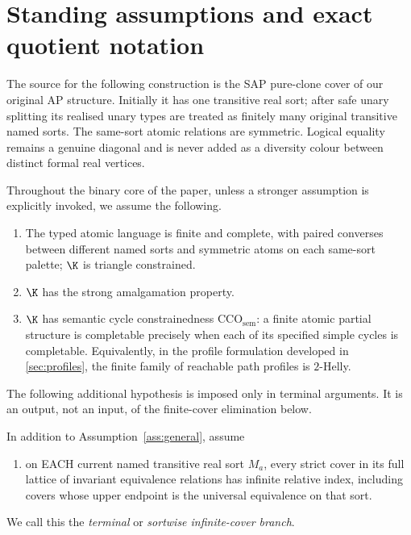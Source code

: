 \section{Standing assumptions and exact quotient notation}
\label{sec:internal-v27-premises}

The source for the following construction is the SAP pure-clone cover of
our original AP structure. Initially it has one transitive real sort;
after safe unary splitting its realised unary types are treated as finitely
many original transitive named sorts. The same-sort atomic relations are
symmetric. Logical equality remains a genuine diagonal and is never added
as a diversity colour between distinct formal real vertices.

\begin{assumption}\label{ass:general}
Throughout the binary core of the paper, unless a stronger assumption is
explicitly invoked, we assume the following.
\begin{enumerate}[label=(A\arabic*)]
\item \label{A:finite} The typed atomic language is finite and complete, with paired converses
      between different named sorts and symmetric atoms on each same-sort
      palette; $\K$ is triangle constrained.
\item \label{A:sap} $\K$ has the strong amalgamation property.
\item \label{A:cco} $\K$ has semantic cycle constrainedness
      $\mathrm{CCO}_{\mathrm{sem}}$: a finite atomic partial structure is
      completable precisely when each of its specified simple cycles is
      completable.  Equivalently, in the profile formulation developed in
      \cref{sec:profiles}, the finite family of reachable path profiles is
      $2$-Helly.
\end{enumerate}
\end{assumption}

The following additional hypothesis is imposed only in terminal arguments.
It is an output, not an input, of the finite-cover elimination below.

\begin{assumption}\label{ass:standing}
In addition to Assumption~\ref{ass:general}, assume
\begin{enumerate}[label=(A\arabic*),start=4]
\item \label{A:cover} on EACH current named transitive real sort $M_a$, every strict
      cover in its full lattice of invariant equivalence relations has
      infinite relative index, including covers whose upper endpoint is
      the universal equivalence on that sort.
\end{enumerate}
We call this the \emph{terminal} or \emph{sortwise infinite-cover branch}.
\end{assumption}


